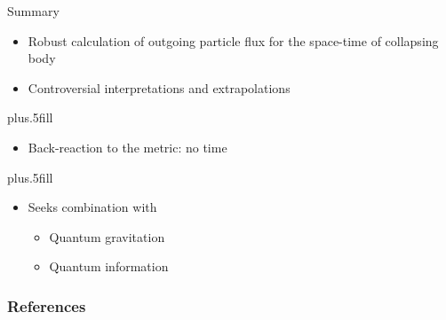 \documentclass{beamer}
\begin{document}
\begin{frame}{Summary}

  \begin{itemize}
  \item
    \alert{Robust} calculation of outgoing particle flux for the space-time
	of collapsing body
  \item
    \alert{Controversial} interpretations and extrapolations
  \end{itemize}
  \vskip0pt plus.5fill
  \begin{itemize}
  \item Back-reaction to the metric: no time
  \end{itemize}  
  \vskip0pt plus.5fill
  \begin{itemize}
  \item
    Seeks combination with
    \begin{itemize}
    \item Quantum gravitation
    \item Quantum information
    \end{itemize}
  \end{itemize}
\end{frame}



\appendix

\begin{frame}[allowframebreaks]
  \frametitle<presentation>{References}
    
    
  \beamertemplatebookbibitems
\printbibliography[type=book]

 
    
  \beamertemplatearticlebibitems
\printbibliography[nottype=book]

\end{frame}
\end{document}
